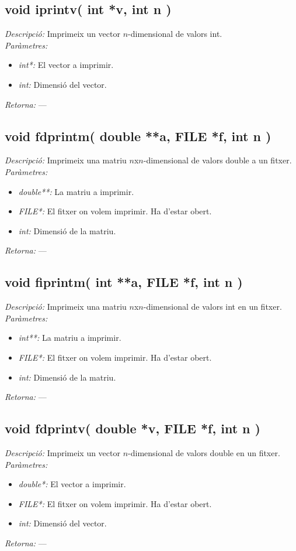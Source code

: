 \documentclass[a4paper,10pt, notitlepage]{article}
\begin{document}
\subsection{void iprintv( int *v, int n )}
\textit{Descripció: }
  Imprimeix un vector $n$-dimensional de valors int.
\\\textit{Paràmetres: }\begin{itemize}[label={--}]
  \item \textit{int*: } El vector a imprimir.
  \item \textit{int: } Dimensió del vector.
\end{itemize}
\textit{Retorna: } ---


\subsection{void fdprintm( double **a, FILE *f, int n )}
\textit{Descripció: }
  Imprimeix una matriu $n$x$n$-dimensional de valors double a un fitxer.
\\\textit{Paràmetres: }\begin{itemize}[label={--}]
  \item \textit{double**: } La matriu a imprimir.
  \item \textit{FILE*: } El fitxer on volem imprimir. Ha d'estar obert. 
  \item \textit{int: } Dimensió de la matriu.
\end{itemize}
\textit{Retorna: } ---



\subsection{void fiprintm( int **a, FILE *f, int n )}
\textit{Descripció: }
  Imprimeix una matriu $n$x$n$-dimensional de valors int en un fitxer.
\\\textit{Paràmetres: }\begin{itemize}[label={--}]
  \item \textit{int**: } La matriu a imprimir.
  \item \textit{FILE*: } El fitxer on volem imprimir. Ha d'estar obert.
  \item \textit{int: } Dimensió de la matriu.
\end{itemize}
\textit{Retorna: } ---



\subsection{void fdprintv( double *v, FILE *f, int n )}
\textit{Descripció: }
  Imprimeix un vector $n$-dimensional de valors double en un fitxer.
\\\textit{Paràmetres: }\begin{itemize}[label={--}]
  \item \textit{double*: } El vector a imprimir.
  \item \textit{FILE*: } El fitxer on volem imprimir. Ha d'estar obert.
  \item \textit{int: } Dimensió del vector.
\end{itemize}
\textit{Retorna: } ---
\end{document}
